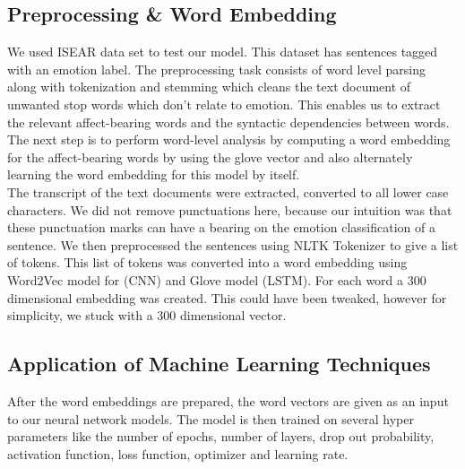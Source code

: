 \documentclass[conference]{IEEEtran}
\numberwithin{equation}{section}
\numberwithin{figure}{section}
\numberwithin{table}{section}
\begin{document}
\subsection{Preprocessing \& Word Embedding}\label{sec:cap-num}
We used ISEAR data set to test our model. This dataset has sentences tagged with an emotion label. The preprocessing task consists of word level parsing along with tokenization and stemming which cleans the text document of unwanted stop words which don't relate to emotion. This enables us to extract the relevant affect-bearing words and the syntactic dependencies between words. The next step is to perform word-level analysis by computing a word embedding for the affect-bearing words by using the glove vector and also alternately learning the word embedding for this model by itself. \\

The transcript of the text documents were extracted, converted to all lower case characters. We did not remove punctuations here, because our intuition was that these punctuation marks can have a bearing on the emotion classification of a sentence. We then preprocessed the sentences using NLTK Tokenizer to give a list of tokens. This list of tokens was converted into a word embedding using Word2Vec model for (CNN) and Glove model (LSTM). For each word a 300 dimensional embedding was created. This could have been tweaked, however for simplicity, we stuck with a 300 dimensional vector. \cite{lstm2}


\subsection{Application of Machine Learning Techniques}\label{sec:colour-illustrations}
After the word embeddings are prepared, the word vectors are given as an input to our neural network models. The model is then trained on several hyper parameters like the number of epochs, number of layers, drop out probability, activation function, loss function, optimizer and learning rate.
\end{document}
